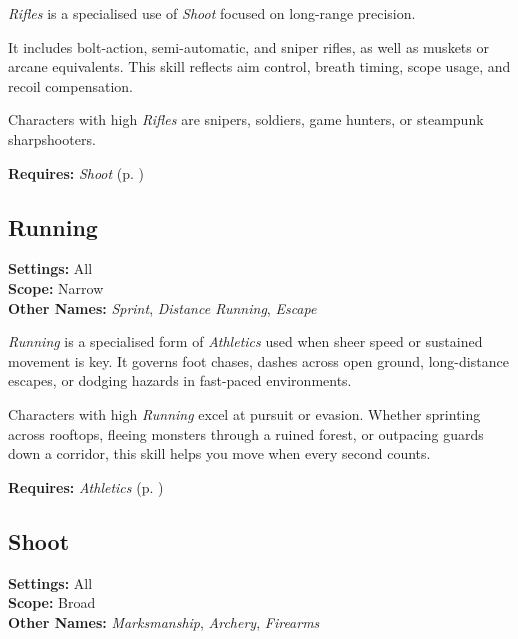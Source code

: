 \emph{Rifles} is a specialised use of \emph{Shoot} focused on long-range precision. 

It includes bolt-action, semi-automatic, and sniper rifles, as well as muskets or arcane equivalents. This skill reflects aim control, breath timing, scope usage, and recoil compensation.

Characters with high \emph{Rifles} are snipers, soldiers, game hunters, or steampunk sharpshooters.

\vspace{0.5\baselineskip}
\noindent\textbf{Requires:} \emph{Shoot} (p. \pageref{skill:shoot})





\subsection{Running}\label{skill:running}
\textbf{Settings:} All\\
\textbf{Scope:} Narrow\\
\textbf{Other Names:} \emph{Sprint}, \emph{Distance Running}, \emph{Escape}\\
\vspace{\baselineskip}

\emph{Running} is a specialised form of \emph{Athletics} used when sheer speed or sustained movement is key. It governs foot chases, dashes across open ground, long-distance escapes, or dodging hazards in fast-paced environments.

Characters with high \emph{Running} excel at pursuit or evasion. Whether sprinting across rooftops, fleeing monsters through a ruined forest, or outpacing guards down a corridor, this skill helps you move when every second counts.

\vspace{0.5\baselineskip}
\noindent\textbf{Requires:} \emph{Athletics} (p. \pageref{skill:athletics})



\subsection{Shoot}\label{skill:shoot}
\textbf{Settings:} All\\
\textbf{Scope:} Broad\\
\textbf{Other Names:} \emph{Marksmanship}, \emph{Archery}, \emph{Firearms}\\
\vspace{\baselineskip}

